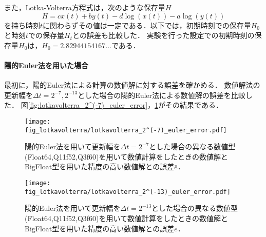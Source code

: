 また，Lotka-Volterra方程式は，次のような保存量$H$
\begin{equation*}
    H = cx(t) + by(t) -d \log\left(x(t)\right) - a \log\left(y(t)\right)
\end{equation*}
を持ち時刻$t$に関わらずその値は一定である．以下では，初期時刻での保存量$H_0$と時刻$t$での保存量$H_t$との誤差も比較した．
実験を行った設定での初期時刻の保存量$H_0$は，$H_0 =2.82944154167\dots$である．
\paragraph*{陽的Euler法を用いた場合}
最初に，陽的Euler法による計算の数値解に対する誤差を確かめる．
数値解法の更新幅を$\Delta t = 2^{-7},2^{-13}$とした場合の陽的Euler法による数値解の誤差を比較した．
図\ref{fig:lotkavolterra_2^(-7)_euler_error}，\ref{fig:lotkavolterra_2^(-13)_euler_error}がその結果である．
\begin{figure}[H]
    \centering
    \begin{minipage}[b]{0.48\columnwidth}
        \centering
        \texttt{[image: fig\_lotkavolterra/lotkavolterra\_2^(-7)\_euler\_error.pdf]}
        \caption{陽的Euler法を用いて更新幅を$\Delta t = 2^{-7}$とした場合の異なる数値型(Float64,Q11f52,Q3f60)を用いて数値計算をしたときの数値解とBigFloat型を用いた精度の高い数値解との誤差$\bar{e}$．}
        \label{fig:lotkavolterra_2^(-7)_euler_error}
    \end{minipage}
    \hspace{0.01\columnwidth}
    \begin{minipage}[b]{0.48\columnwidth}
        \centering
        \texttt{[image: fig\_lotkavolterra/lotkavolterra\_2^(-13)\_euler\_error.pdf]}
        \caption{陽的Euler法を用いて更新幅を$\Delta t =  2^{-13}$とした場合の異なる数値型(Float64,Q11f52,Q3f60)を用いて数値計算をしたときの数値解とBigFloat型を用いた精度の高い数値解との誤差$\bar{e}$．}
        \label{fig:lotkavolterra_2^(-13)_euler_error}
    \end{minipage}
\end{figure}

